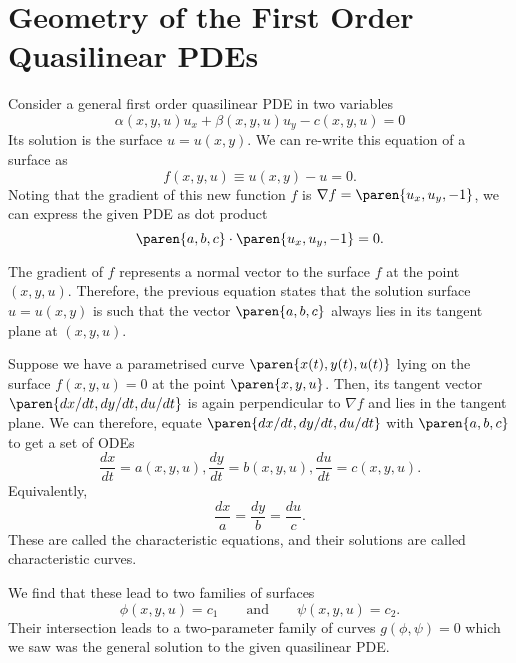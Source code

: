 \documentclass[11pt]{penrose}
\begin{document}
\section{Geometry of the First Order Quasilinear PDEs}
Consider a general first order quasilinear PDE in two variables
\begin{equation}
    \alpha(x, y, u) u_x + \beta(x, y, u) u_y - c(x, y, u) = 0
\end{equation}
Its solution is the surface $u = u(x,y)$. We can re-write this equation of a surface as
\begin{equation}
    f(x, y, u) \equiv u(x,y) - u = 0.
\end{equation}
Noting that the gradient of this new function $f$ is $\nabla f = \paren{ u_x, u_y, -1 }$, we can express the given PDE as dot product
\begin{equation}
    \paren{a, b, c} \cdot \paren{ u_x, u_y, -1 } = 0.
\end{equation}

The gradient of $f$ represents a normal vector to the surface $f$ at the point $(x, y, u)$. Therefore, the previous equation states that the solution surface $u = u(x,y)$ is such that the vector $\paren{a, b, c}$ always lies in its tangent plane at $(x, y, u)$.

Suppose we have a parametrised curve $\paren{x(t), y(t), u(t)}$ lying on the surface $f(x,y,u) = 0$ at the point $\paren{x,y,u}$. Then, its tangent vector $\paren{dx/dt, dy/dt, du/dt}$ is again perpendicular to $\nabla f$ and lies in the tangent plane. We can therefore, equate $\paren{dx/dt, dy/dt, du/dt}$ with $\paren{a, b, c}$ to get a set of ODEs
\begin{equation}
    \frac{dx}{dt} = a(x,y,u),
    \frac{dy}{dt} = b(x,y,u),
    \frac{du}{dt} = c(x,y,u).
\end{equation}
Equivalently,
\begin{equation}
    \frac{dx}{a} = \frac{dy}{b} = \frac{du}{c}.
\end{equation}
These are called the characteristic equations, and their solutions are called characteristic curves.

We find that these lead to two families of surfaces
\begin{equation}
    \phi(x,y,u) = c_1
    \qquad\text{and}\qquad
    \psi(x,y,u) = c_2.
\end{equation}
Their intersection leads to a two-parameter family of curves $g(\phi, \psi) = 0$ which we saw was the general solution to the given quasilinear PDE.
\end{document}
